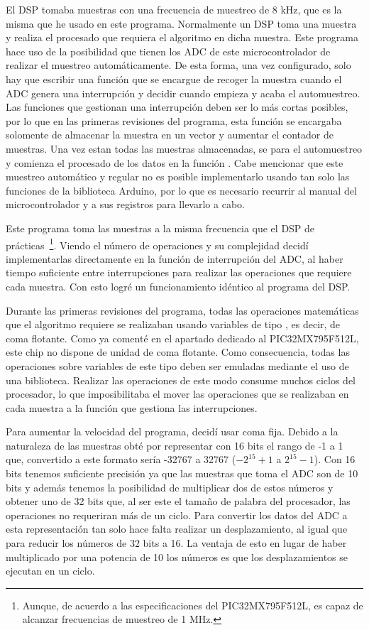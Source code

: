 El DSP tomaba muestras con una frecuencia de muestreo de 8 kHz, que es la misma que he usado en este programa. Normalmente un DSP toma una muestra y realiza el procesado que requiera el algoritmo en dicha muestra. Este programa hace uso de la posibilidad que tienen los ADC de este microcontrolador de realizar el muestreo automáticamente. De esta forma, una vez configurado, solo hay que escribir una función que se encargue de recoger la muestra cuando el ADC genera una interrupción y decidir cuando empieza y acaba el automuestreo. Las funciones que gestionan una interrupción deben ser lo más cortas posibles, por lo que en las primeras revisiones del programa, esta función se encargaba solomente de almacenar la muestra en un vector y aumentar el contador de muestras. Una vez estan todas las muestras almacenadas, se para el automuestreo y comienza el procesado de los datos en la función . Cabe mencionar que este muestreo automático y regular no es posible implementarlo usando tan solo las funciones de la biblioteca Arduino, por lo que es necesario recurrir al manual del microcontrolador y a sus registros para llevarlo a cabo.

Este programa toma las muestras a la misma frecuencia que el DSP de prácticas~\footnote{Aunque, de acuerdo a las especificaciones del PIC32MX795F512L, es capaz de alcanzar frecuencias de muestreo de 1 MHz.}. Viendo el número de operaciones y su complejidad decidí implementarlas directamente en la función de interrupción del ADC, al haber tiempo suficiente entre interrupciones para realizar las operaciones que requiere cada muestra. Con esto logré un funcionamiento idéntico al programa del DSP.\@

Durante las primeras revisiones del programa, todas las operaciones matemáticas que el algoritmo requiere se realizaban usando variables de tipo , es decir, de coma flotante. Como ya comenté en el apartado dedicado al PIC32MX795F512L, este chip no dispone de unidad de coma flotante. Como consecuencia, todas las operaciones sobre variables de este tipo deben ser emuladas mediante el uso de una biblioteca. Realizar las operaciones de este modo consume muchos ciclos del procesador, lo que imposibilitaba el mover las operaciones que se realizaban en cada muestra a la función que gestiona las interrupciones.

Para aumentar la velocidad del programa, decidí usar coma fija. Debido a la naturaleza de las muestras obté por representar con 16 bits el rango de -1 a 1 que, convertido a este formato sería -32767 a 32767 (\(-2^{15}+1\) a \(2^{15}-1\)). Con 16 bits tenemos suficiente precisión ya que las muestras que toma el ADC son de 10 bits y además tenemos la posibilidad de multiplicar dos de estos números y obtener uno de 32 bits que, al ser este el tamaño de palabra del procesador, las operaciones no requeriran más de un ciclo. Para convertir los datos del ADC a esta representación tan solo hace falta realizar un desplazamiento, al igual que para reducir los números de 32 bits a 16. La ventaja de esto en lugar de haber multiplicado por una potencia de 10 los números es que los desplazamientos se ejecutan en un ciclo.

